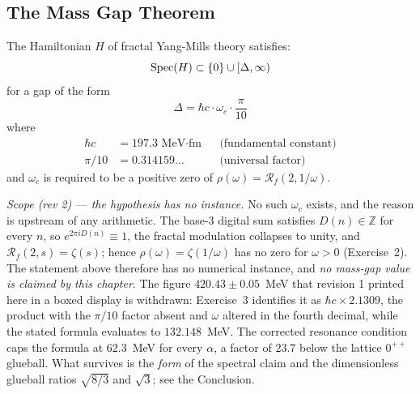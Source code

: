 \subsection{The Mass Gap Theorem}

\begin{theorem}\label{thm:mass-gap-ym}
The Hamiltonian $H$ of fractal Yang-Mills theory satisfies:
\begin{equation}
\operatorname{Spec}(H) \subset \{0\} \cup [\Delta, \infty)
\end{equation}
for a gap of the form
\begin{equation}
\Delta = \hbar c \cdot \omega_c \cdot \frac{\pi}{10}
\end{equation}
where
\begin{align}
\hbar c &= 197.3 \text{ MeV·fm} && \text{(fundamental constant)} \\
\pi/10 &= 0.314159\ldots && \text{(universal factor)}
\end{align}
and $\omega_c$ is required to be a positive zero of
$\rho(\omega) = \mathcal{R}_f(2, 1/\omega)$.

\emph{Scope (rev 2) --- the hypothesis has no instance.} No such $\omega_c$
exists, and the reason is upstream of any arithmetic. The base-3 digital sum
satisfies $D(n)\in\mathbb{Z}$ for every $n$, so $e^{2\pi i D(n)}\equiv 1$, the
fractal modulation collapses to unity, and $\mathcal{R}_f(2,s)=\zeta(s)$; hence
$\rho(\omega)=\zeta(1/\omega)$ has no zero for $\omega>0$ (Exercise~2). The
statement above therefore has no numerical instance, and \emph{no mass-gap
value is claimed by this chapter}. The figure $420.43\pm0.05$~MeV that revision
1 printed here in a boxed display is withdrawn: Exercise~3 identifies it as
$\hbar c\times 2.1309$, the product with the $\pi/10$ factor absent and
$\omega$ altered in the fourth decimal, while the stated formula evaluates to
$132.148$~MeV. The corrected resonance condition caps the formula at
$62.3$~MeV for every $\alpha$, a factor of $23.7$ below the lattice $0^{++}$
glueball. What survives is the \emph{form} of the spectral claim and the
dimensionless glueball ratios $\sqrt{8/3}$ and $\sqrt{3}$; see the Conclusion.
\end{theorem}

